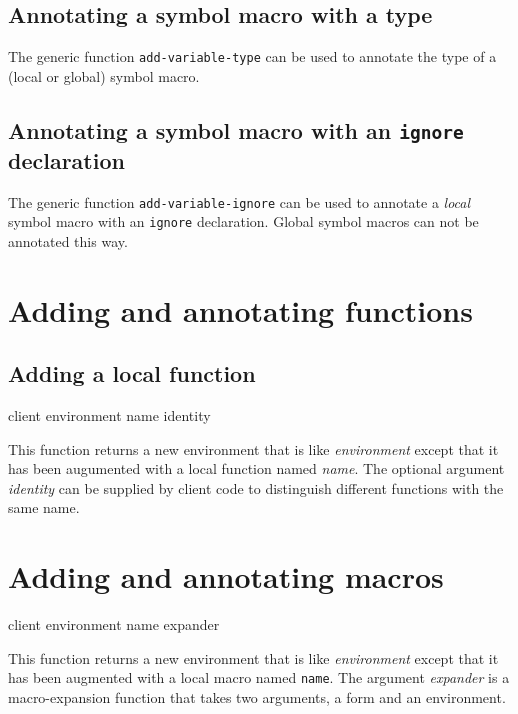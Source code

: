\subsection{Annotating a symbol macro with a type}
\label{sec-annotating-a-symbol-macro-with-a-type}

The generic function \texttt{add-variable-type}
 can be used to annotate
the type of a (local or global) symbol macro.

\subsection{Annotating a symbol macro with an \texttt{ignore} declaration}
\label{sec-annotating-a-local-symbol-macro-with-ignore}

The generic function \texttt{add-variable-ignore}
 can be used to annotate
a \emph{local} symbol macro with an \texttt{ignore} declaration.
Global symbol macros can not be annotated this way.

\section{Adding and annotating functions}

\subsection{Adding a local function}

{\footnotesize
{} {client environment name \optional identity}
}

This function returns a new environment that is like
\textit{environment} except that it has been augumented with a local
function named \textit{name}.  The optional argument \textit{identity}
can be supplied by client code to distinguish different functions with
the same name.

\section{Adding and annotating macros}

{\footnotesize
{} {client environment name expander}
}

This function returns a new environment that is like
\textit{environment} except that it has been augmented with a local
macro named \texttt{name}.  The argument \textit{expander} is a
macro-expansion function that takes two arguments, a form and an
environment.

